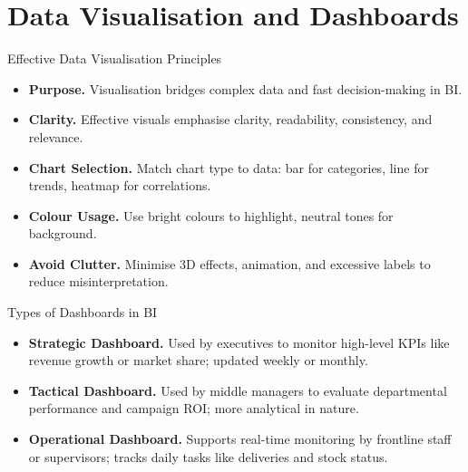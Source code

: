 \documentclass[aspectratio=169, table]{beamer}
\begin{document}
\section{Data Visualisation and Dashboards}

\begin{frame}{Effective Data Visualisation Principles}
	\vspace{20pt}
	\begin{itemize}
		\item \textbf{Purpose.} Visualisation bridges complex data and fast decision-making in BI.
		\item \textbf{Clarity.} Effective visuals emphasise clarity, readability, consistency, and relevance.
		\item \textbf{Chart Selection.} Match chart type to data: bar for categories, line for trends, heatmap for correlations.
		\item \textbf{Colour Usage.} Use bright colours to highlight, neutral tones for background.
		\item \textbf{Avoid Clutter.} Minimise 3D effects, animation, and excessive labels to reduce misinterpretation.
	\end{itemize}
\end{frame}


\begin{frame}{Types of Dashboards in BI}
	\vspace{20pt}
	\begin{itemize}
		\item \textbf{Strategic Dashboard.} Used by executives to monitor high-level KPIs like revenue growth or market share; updated weekly or monthly.
		\item \textbf{Tactical Dashboard.} Used by middle managers to evaluate departmental performance and campaign ROI; more analytical in nature.
		\item \textbf{Operational Dashboard.} Supports real-time monitoring by frontline staff or supervisors; tracks daily tasks like deliveries and stock status.
	\end{itemize}
\end{frame}
\end{document}
